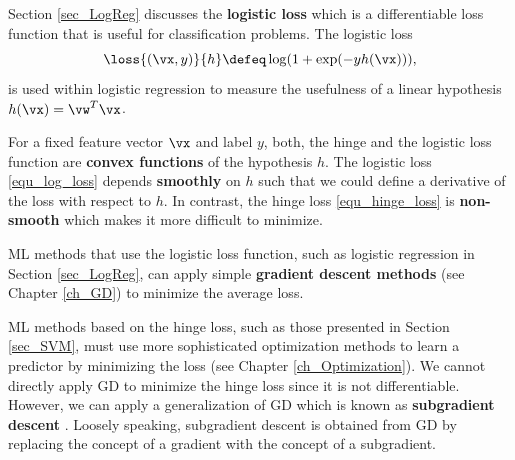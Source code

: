 \documentclass[12pt]{report}
\begin{document}
Section \ref{sec_LogReg} discusses the {\bf logistic loss} which is 
a differentiable loss function that is useful for classification problems. 
The logistic loss
\begin{equation} 
\label{equ_log_loss}
\loss{(\vx,y)}{h} \defeq  \log ( 1 + \exp(- y h(\vx))),
\end{equation}
is used within logistic regression to measure the usefulness of 
a linear hypothesis $h(\vx) = \vw^{T} \vx$. 

For a fixed feature vector $\vx$ and label $y$, both, the hinge 
and the logistic loss function are {\bf convex functions} of 
the hypothesis $h$. The logistic loss \eqref{equ_log_loss} 
depends {\bf smoothly} on $h$ such that we could define a derivative 
of the loss with respect to $h$. In contrast, the hinge loss 
\eqref{equ_hinge_loss} is {\bf non-smooth} which makes it 
more difficult to minimize. 

ML methods that use the logistic loss function, such 
as logistic regression in Section \ref{sec_LogReg}, can 
apply simple {\bf gradient descent methods} (see Chapter \ref{ch_GD}) 
to minimize the average loss. 

ML methods based on the hinge loss, such as those presented 
in Section \ref{sec_SVM}, must use more sophisticated optimization 
methods to learn a predictor by minimizing the loss (see Chapter \ref{ch_Optimization}).  
We cannot directly apply GD to minimize the hinge loss since 
it is not differentiable. However, we can apply a generalization of 
GD which is known as {\bf subgradient descent} \cite{CvxBubeck2015}. 
Loosely speaking, subgradient descent is obtained from GD 
by replacing the concept of a gradient with the concept 
of a subgradient. 
\end{document}
